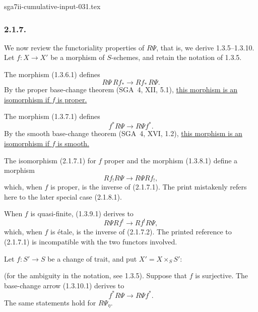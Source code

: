 \begin{filecontents*}{sga7ii-cumulative-input-031.tex}
\subsubsection*{2.1.7.}
We now review the functoriality properties of $R\Psi$, that is, we
derive 1.3.5--1.3.10.  Let $f:X\longrightarrow X'$ be a morphism of
$S$-schemes, and retain the notation of 1.3.5.

The morphism (1.3.6.1) defines
\begin{equation}\tag{2.1.7.1}
R\Psi\,Rf_*\longrightarrow Rf_*\,R\Psi.
\end{equation}
By the proper base-change theorem (SGA~4, XII, 5.1),
\underline{this morphism is an isomorphism if $f$ is proper.}

The morphism (1.3.7.1) defines
\begin{equation}\tag{2.1.7.2}
f^*R\Psi\longrightarrow R\Psi f^*.
\end{equation}
By the smooth base-change theorem (SGA~4, XVI, 1.2),
\underline{this morphism is an isomorphism if $f$ is smooth.}

The isomorphism (2.1.7.1) for $f$ proper and the morphism (1.3.8.1)
define a morphism
\begin{equation}\tag{2.1.7.3}
Rf_!R\Psi\longrightarrow R\Psi Rf_!,
\end{equation}
which, when $f$ is proper, is the inverse of (2.1.7.1).  The print
mistakenly refers here to the later special case (2.1.8.1).

When $f$ is quasi-finite, (1.3.9.1) derives to
\begin{equation}\tag{2.1.7.4}
R\Psi Rf^!\longrightarrow Rf^!R\Psi,
\end{equation}
which, when $f$ is \'{e}tale, is the inverse of (2.1.7.2).  The printed
reference to (2.1.7.1) is incompatible with the two functors involved.

Let $f:S'\longrightarrow S$ be a change of trait, and put
$X'=X\times_SS'$:
\begin{center}
\end{center}
(for the ambiguity in the notation, see 1.3.5).  Suppose that $f$ is
surjective.  The base-change arrow (1.3.10.1) derives to
\begin{equation}\tag{2.1.7.5}
f^*R\Psi\longrightarrow R\Psi f^*.
\end{equation}
The same statements hold for $R\Psi_\eta$.


\end{filecontents*}
